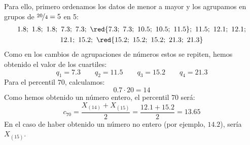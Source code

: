 \begin{ejercicio}
\begin{itemize}
            Para ello, primero ordenamos los datos de menor a mayor y los agrupamos en grupos de $\nicefrac{20}{4} = 5$ en 5:
            \begin{gather*}
                1.8;\ 1.8;\ 1.8;\ 7.3;\ 7.3;\ \red{7.3;\ 7.3;\ 10.5;\ 10.5;\ 11.5};\ 11.5;\ 12.1;\ 12.1;\\ 12.1;\ 15.2;\ \red{15.2;\ 15.2;\ 15.2;\ 21.3;\ 21.3}
            \end{gather*}
            Como en los cambios de agrupaciones de números estos se repiten, hemos obtenido el valor de los cuartiles:
            \begin{equation*}
                q_1 = 7.3 \qquad q_2 = 11.5 \qquad q_3 = 15.2 \qquad q_4 = 21.3
            \end{equation*}
            Para el percentil $70$, calculamos:
            \begin{equation*}
                0.7\cdot 20 = 14
            \end{equation*}
            Como hemos obtenido un número entero, el percentil 70 será:
            \begin{equation*}
                c_{70} = \dfrac{X_{(14)} + X_{(15)}}{2} = \dfrac{12.1 + 15.2}{2} = 13.65
            \end{equation*}
            En el caso de haber obtenido un número no entero (por ejemplo, $14.2$), sería $X_{(15)}$.
    \end{itemize}
\end{ejercicio}

